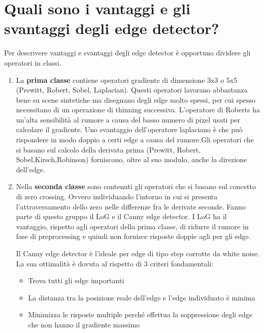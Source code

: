 \section{Quali sono i vantaggi e gli svantaggi degli edge detector?}
Per descrivere vantaggi e svantaggi degli edge detector è opportuno dividere gli operatori in classi.
\begin{enumerate}
	\item La \textbf{prima classe} contiene operatori gradiente di dimensione 3x3 o 5x5 (Prewitt, Robert, Sobel,	Laplacian). Questi operatori lavorano abbastanza bene su scene sintetiche ma disegnano degli edge	molto spessi, per cui spesso necessitano di un operazione di thinning successiva. L'operatore di Roberts ha un'alta sensibilità al rumore a causa del basso numero di pixel usati per calcolare il gradiente. Uno svantaggio dell'operatore laplaciano è che può rispondere in modo doppio a certi edge a causa del rumore.Gli operatori che si basano sul calcolo della derivata prima (Prewitt, Robert, Sobel,Kirsch,Robinson) forniscono, oltre al suo modulo, anche la direzione dell'edge.
	
	\item Nella \textbf{seconda classe} sono contenuti gli operatori che si basano sul concetto di zero crossing. Ovvero individuando l'intorno in cui si presenta l'attraversamento dello zero nelle differenze fra le derivate seconde. Fanno parte di questo gruppo il LoG e il Canny edge detector. I LoG ha il vantaggio, rispetto agli operatori della prima classe, di ridurre il rumore in fase di preprocessing e	quindi non fornisce risposte doppie agli per gli edge.
	
	Il Canny edge detector è l'ideale per edge di tipo step corrotte da white noise. La sua ottimalità è
	dovuta al rispetto di 3 criteri fondamentali:
	\begin{itemize}
		\item Trova tutti gli edge importanti
		
		\item La distanza tra la posizione reale dell'edge e l'edge individuato è minima
		
		\item Minimizza le risposte multiple perché effettua la soppressione degli edge che non hanno il gradiente massimo
	\end{itemize}
\end{enumerate}